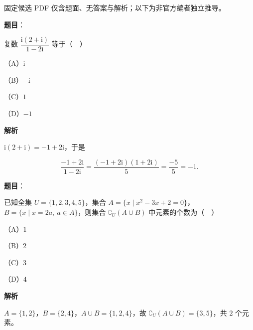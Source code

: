 

\begin{gktip}
固定候选 PDF 仅含题面、无答案与解析；以下为非官方编者独立推导。
\end{gktip}

\begin{answer}

\textbf{题目}：

复数 $\dfrac{\mathrm i(2+\mathrm i)}{1-2\mathrm i}$ 等于（　）

（A）$\mathrm i$

（B）$-\mathrm i$

（C）$1$

（D）$-1$

\textbf{解析}

$\mathrm i(2+\mathrm i)=-1+2\mathrm i$，于是

\nopagebreak[4]
\[\frac{-1+2\mathrm i}{1-2\mathrm i}=\frac{(-1+2\mathrm i)(1+2\mathrm i)}{5}=\frac{-5}{5}=-1.\]


\end{answer}
\begin{answer}

\textbf{题目}：

已知全集 $U=\{1,2,3,4,5\}$，集合 $A=\{x\mid x^2-3x+2=0\}$，$B=\{x\mid x=2a,\ a\in A\}$，则集合 $\complement_U(A\cup B)$ 中元素的个数为（　）

（A）$1$

（B）$2$

（C）$3$

（D）$4$

\textbf{解析}

$A=\{1,2\}$，$B=\{2,4\}$，$A\cup B=\{1,2,4\}$，故 $\complement_U(A\cup B)=\{3,5\}$，共 $2$ 个元素。


\end{answer}
